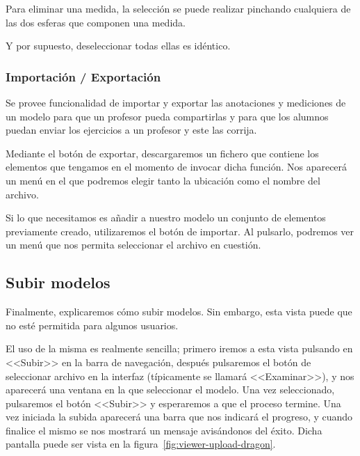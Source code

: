 Para eliminar una medida, la selección se puede realizar pinchando cualquiera de las dos esferas que componen una medida.

Y por supuesto, deseleccionar todas ellas es idéntico.

\subsubsection{Importación / Exportación}
Se provee funcionalidad de importar y exportar las anotaciones y mediciones de un modelo para que un profesor pueda compartirlas y para que los alumnos puedan enviar los ejercicios a un profesor y este las corrija.

Mediante el botón de exportar, descargaremos un fichero que contiene los elementos que tengamos en el momento de invocar dicha función. Nos aparecerá un menú en el que podremos elegir tanto la ubicación como el nombre del archivo.

Si lo que necesitamos es añadir a nuestro modelo un conjunto de elementos previamente creado, utilizaremos el botón de importar. Al pulsarlo, podremos ver un menú que nos permita seleccionar el archivo en cuestión.

\subsection{Subir modelos}
Finalmente, explicaremos cómo subir modelos. Sin embargo, esta vista puede que no esté permitida para algunos usuarios.

El uso de la misma es realmente sencilla; primero iremos a esta vista pulsando en <<Subir>> en la barra de navegación, después pulsaremos el botón de seleccionar archivo en la interfaz (típicamente se llamará <<Examinar>>), y nos aparecerá una ventana en la que seleccionar el modelo. Una vez seleccionado, pulsaremos el botón <<Subir>> y esperaremos a que el proceso termine. Una vez iniciada la subida aparecerá una barra que nos indicará el progreso, y cuando finalice el mismo se nos mostrará un mensaje avisándonos del éxito. Dicha pantalla puede ser vista en la figura~\ref{fig:viewer-upload-dragon}.
